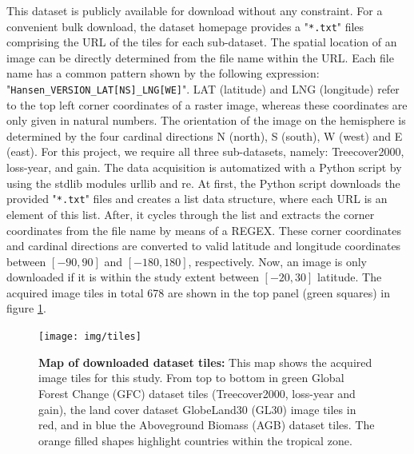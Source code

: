 		This dataset is publicly available for download without any constraint. For a convenient bulk download, the dataset homepage provides a "\verb|*.txt|" files comprising the \ac{URL} of the tiles for each sub-dataset. The spatial location of an image can be directly determined from the file name within the \ac{URL}. Each file name has a common pattern shown by the following expression: "\verb|Hansen_VERSION_LAT[NS]_LNG[WE]|". LAT (latitude) and LNG (longitude) refer to the top left corner coordinates of a raster image, whereas these coordinates are only given in natural numbers. The orientation of the image on the hemisphere is determined by the four cardinal directions N (north), S (south), W (west) and E (east). For this project, we require all three sub-datasets, namely: Treecover2000, loss-year, and gain. The data acquisition is automatized with a Python script by using the \ac{stdlib} modules urllib and re. At first, the Python script downloads the provided "\verb|*.txt|" files and creates a list data structure, where each \ac{URL} is an element of this list. After, it cycles through the list and extracts the corner coordinates from the file name by means of a \ac{REGEX}. These corner coordinates and cardinal directions are converted to valid latitude and longitude coordinates between $[-90, 90]$ and $[-180, 180]$, respectively. Now, an image is only downloaded if it is within the study extent between $[-20, 30]$ latitude. The acquired image tiles in total 678 are shown in the top panel (green squares) in figure \ref{fig:dataset_tiles}.
		\begin{figure}[ht]
			\centering
			\texttt{[image: img/tiles]}
			\caption[Map of downloaded dataset tiles]{\textbf{Map of downloaded dataset tiles:} This map shows the acquired image tiles for this study. From top to bottom in green Global Forest Change (GFC) dataset tiles (Treecover2000, loss-year and gain), the land cover dataset GlobeLand30 (GL30) image tiles in red, and in blue the Aboveground Biomass (AGB) dataset tiles. The orange filled shapes highlight countries within the tropical zone.}
			\label{fig:dataset_tiles}
		\end{figure}

